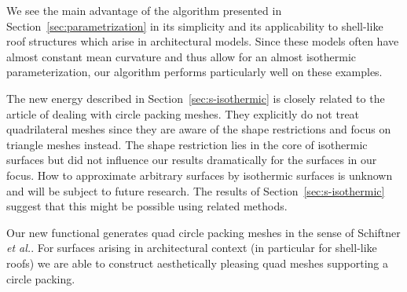 \documentclass[twoside]{article}
\begin{document}
\newpage
We see the main advantage of the algorithm presented in
Section~\ref{sec:parametrization} in its simplicity and its applicability to
shell-like roof structures which arise in architectural models. Since these
models often have almost constant mean curvature and thus allow for an almost
isothermic parameterization, our algorithm performs particularly well on these
examples.


The new energy described in Section~\ref{sec:s-isothermic} is closely related
to the article of \cite{schiftner-2009-cp} dealing with
circle packing meshes. They explicitly do not treat quadrilateral meshes since
they are aware of the shape restrictions and focus on triangle meshes instead.
The shape restriction lies in the core of isothermic surfaces but
did not influence our results dramatically for the surfaces in our focus. How
to approximate arbitrary surfaces by isothermic surfaces is unknown and will be
subject to future research. The results of Section~\ref{sec:s-isothermic}
suggest that this might be possible using related methods.

Our new functional generates quad circle packing meshes in the sense of
Schiftner \emph{et al.}. For surfaces arising in architectural context (in
particular for shell-like roofs) we are able to construct aesthetically
pleasing quad meshes supporting a circle packing. 

\end{document}
